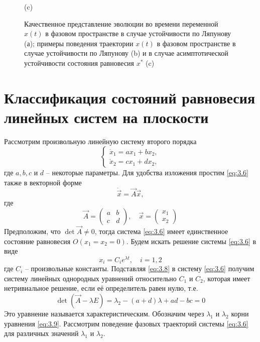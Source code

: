 \begin{figure}[h!]
\begin{minipage}{0.49\linewidth}
             (c)
        \end{minipage}
        \label{fig:3.2}
        \caption{Качественное представление эволюции во времени переменной $x(t)$ в фазовом пространстве в случае устойчивости по Ляпунову (а); примеры поведения траектории $x(t)$ в фазовом пространстве в случае устойчивости по Ляпунову (b) и в случае асимптотической устойчивости состояния равновесия $x^*$ (c) }
\end{figure}

\section{Классификация состояний равновесия линейных систем на плоскости}%
\label{sub:3.2}

Рассмотрим произвольную линейную систему второго порядка 
\begin{equation}
        \label{eq:3.6}
        \begin{cases}
                \dot x_1 = ax_1 + bx_2, \\
                \dot x_2 = cx_1 +dx_2,
        \end{cases}
\end{equation}
где $a, b ,c$ и $d$ -- некоторые параметры. Для удобства изложения простим \eqref{eq:3.6} также в векторной форме
\begin{equation}
        \label{eq:3.7}
        \dot{\vec x} = \vec A \vec x, 
\end{equation}
где
\begin{equation}
        \label{eq:}
        \vec A =
        \begin{pmatrix}
                a & b \\
                c & d
        \end{pmatrix}, \quad 
        \vec x = 
        \begin{pmatrix}
                x_1 \\
                x_2 
        \end{pmatrix}
\end{equation}
Предположим, что $\det \vec A \neq 0$, тогда система \eqref{eq:3.6} имеет единственное состояние равновесия $O(x_1=x_2=0)$. Будем искать решение системы \eqref{eq:3.6} в виде
\begin{equation}
        \label{eq:3.8}
        x_i = C_i e^{ \lambda t}, \quad i=1,2   
\end{equation}
где $C_i$ -- произвольные константы. Подставляя 
\eqref{eq:3.8} в систему \eqref{eq:3.6} получим систему линейных однородных уравнений относительно $C_1$ и $C_2$, которая имеет нетривиальное решение, если её определитель равен нулю, т.е.
\begin{equation}
        \label{eq:3.9}
        \det(\vec A - \lambda E) = \lambda_2 - (a+d) \lambda + ad - bc =0
\end{equation}
Это уравнение называется характеристическим. Обозначим через $\lambda_1$ и $\lambda_2$ корни уравнения \eqref{eq:3.9}. Рассмотрим поведение фазовых траекторий системы \eqref{eq:3.6} для различных значений $\lambda_1$ и $\lambda_2$.

